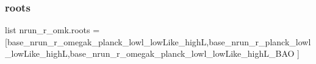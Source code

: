 \mbox{\label{namespacenrun__r__omk_a4e3888abd26c268bbccd4579fbd91dbc}} 
\subsubsection{\texorpdfstring{roots}{roots}}
{\footnotesize\ttfamily list nrun\+\_\+r\+\_\+omk.\+roots = \mbox{[}\textquotesingle{}base\+\_\+nrun\+\_\+r\+\_\+omegak\+\_\+planck\+\_\+lowl\+\_\+low\+Like\+\_\+highL\textquotesingle{},\textquotesingle{}base\+\_\+nrun\+\_\+r\+\_\+planck\+\_\+lowl\+\_\+low\+Like\+\_\+highL\textquotesingle{},\textquotesingle{}base\+\_\+nrun\+\_\+r\+\_\+omegak\+\_\+planck\+\_\+lowl\+\_\+low\+Like\+\_\+high\+L\+\_\+\+B\+AO\textquotesingle{} \mbox{]}}

